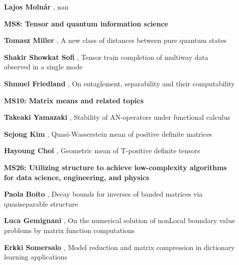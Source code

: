 \documentclass[ILAS2025-program.tex]{subfiles}
\begin{document}
\begin{description}
\begin{description}
        \item[] \textbf{Lajos Molnár} , nan
        \end{description}
    \begin{description}
    \item[] {\color{mstitle}\textbf{MS8: Tensor and quantum information science}} 
    \item[] \textbf{Tomasz Miller} , A new class of distances between pure quantum states
        \item[] \textbf{Shakir Showkat Sofi} , Tensor train completion of multiway data observed in a single mode
        \item[] \textbf{Shmuel Friedland} , On entaglement, separability and their computability
        \end{description}
    \begin{description}
    \item[] {\color{mstitle}\textbf{MS10: Matrix means and related topics}} 
    \item[] \textbf{Takeaki Yamazaki} , Stability of AN-operators under functional calculus
        \item[] \textbf{Sejong Kim} , Quasi-Wasserstein mean of positive definite matrices
        \item[] \textbf{Hayoung Choi} , Geometric mean of T-positive definite tensors
        \end{description}
    \begin{description}
    \item[] {\color{mstitle}\textbf{MS26: Utilizing structure to achieve low-complexity algorithms for data science, engineering, and physics}} 
    \item[] \textbf{Paola Boito} , Decay bounds for inverses of banded matrices via quasiseparable structure
        \item[] \textbf{Luca Gemignani} , On the numerical solution of nonLocal boundary value problems by matrix function computations
        \item[] \textbf{Erkki Somersalo} , Model reduction and matrix compression in dictionary learning applications
        \end{description}
    \begin{description}

\end{description}
\end{description}
\end{document}
